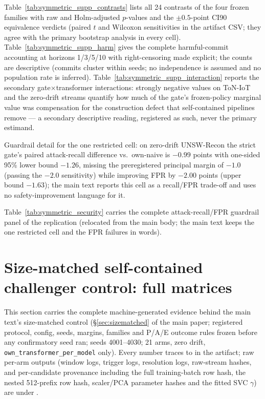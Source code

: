 \documentclass[a4paper,11pt]{article}
\begin{document}
Table~\ref{tab:symmetric_supp_contrasts} lists all 24 contrasts of the four frozen
families with raw and Holm-adjusted $p$-values and the $\pm0.5$-point CI90 equivalence
verdicts (paired $t$ and Wilcoxon sensitivities in the artifact CSV; they agree with the
primary bootstrap analysis in every cell). Table~\ref{tab:symmetric_supp_harm} gives the
complete harmful-commit accounting at horizons 1/3/5/10 with right-censoring made
explicit; the counts are descriptive (commits cluster within seeds; no independence is
assumed and no population rate is inferred). Table~\ref{tab:symmetric_supp_interaction}
reports the secondary gate$\times$transformer interactions: strongly negative values on
ToN-IoT and the zero-drift streams quantify how much of the gate's frozen-policy marginal
value was compensation for the construction defect that self-contained pipelines remove
--- a secondary descriptive reading, registered as such, never the primary estimand.

Guardrail detail for the one restricted cell: on zero-drift UNSW-Recon the strict gate's
paired attack-recall difference vs.\ own-naive is $-0.99$ points with one-sided 95\% lower
bound $-1.26$, missing the preregistered principal margin of $-1.0$ (passing the $-2.0$
sensitivity) while improving FPR by $-2.00$ points (upper bound $-1.63$); the main text
reports this cell as a recall/FPR trade-off and uses no safety-improvement language for it.

Table~\ref{tab:symmetric_security} carries the complete attack-recall/FPR guardrail panel of the replication (relocated from the main body; the main text keeps the one restricted cell and the FPR failures in words).






\section{Size-matched self-contained challenger control: full matrices}
\label{sec:supp_sizematched}

This section carries the complete machine-generated evidence behind the main text's
size-matched control (\S\ref{sec:sizematched} of the main paper; registered protocol, config, seeds,
margins, families and P/A/E outcome rules frozen before any confirmatory seed ran;
seeds 4001--4030; 21 arms, zero drift, \texttt{own\_transformer\_per\_model} only).
Every number traces to 
in the artifact; raw per-arm outputs (window logs, trigger logs, resolution logs,
raw-stream hashes, and per-candidate provenance including the full training-batch row
hash, the nested 512-prefix row hash, scaler/PCA parameter hashes and the fitted SVC
$\gamma$) are under .
\end{document}
